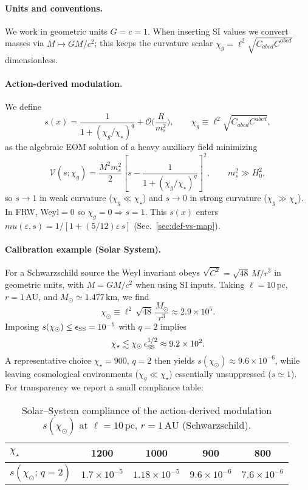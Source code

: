 \documentclass[aps,prd,onecolumn,superscriptaddress,nofootinbib]{revtex4-2}
\def\mu{mu}%
\providecommand{\be}{\begin{equation}}
\providecommand{\ee}{\end{equation}}
\begin{document}
\paragraph{Units and conventions.}
We work in geometric units \(G=c=1\). When inserting SI values we convert masses via \(M\mapsto GM/c^2\); this keeps the curvature scalar \(\chi_g=\ell^2\sqrt{C_{abcd}C^{abcd}}\) dimensionless.

\paragraph{Action-derived modulation.}
We define
\be
s(x)=\frac{1}{1+(\chi_g/\chi_\star)^q}+\mathcal O\!\Big(\frac{R}{m_s^2}\Big),\qquad \chi_g\equiv \ell^2\sqrt{C_{abcd}C^{abcd}},
\ee
as the algebraic EOM solution of a heavy auxiliary field minimizing
\be
\mathcal V(s;\chi_g)=\frac{M^2 m_s^2}{2}\left[s-\frac{1}{1+(\chi_g/\chi_\star)^q}\right]^2,\qquad m_s^2\gg H_0^2,
\ee
so $s\!\to\!1$ in weak curvature (\(\chi_g\!\ll\!\chi_\star\)) and $s\!\to\!0$ in strong curvature (\(\chi_g\!\gg\!\chi_\star\)). In FRW, Weyl$=0$ so \(\chi_g=0\Rightarrow s=1\).
This $s(x)$ enters \(\mu(\varepsilon,s)=1/[1+(5/12)\varepsilon\,s]\) (Sec.~\ref{sec:def-vs-map}).

\paragraph{Calibration example (Solar System).}
For a Schwarzschild source the Weyl invariant obeys \(\sqrt{C^2}=\sqrt{48}\,M/r^3\) in geometric units, with \(M=GM/c^2\) when using SI inputs. Taking \(\ell=10\,\mathrm{pc}\), \(r=1\,\mathrm{AU}\), and \(M_\odot\simeq 1.477\,\mathrm{km}\), we find
\[
\chi_\odot \equiv \ell^2 \, \sqrt{48}\,\frac{M_\odot}{r^3} \approx 2.9\times 10^{5}.
\]
Imposing \(s(\chi_\odot)\le \epsilon_{\rm SS}=10^{-5}\) with \(q=2\) implies
\[
\chi_\star \lesssim \chi_\odot\,\epsilon_{\rm SS}^{1/2} \approx 9.2\times 10^{2}.
\]
A representative choice \(\chi_\star=900\), \(q=2\) then yields \(s(\chi_\odot)\approx 9.6\times 10^{-6}\), while leaving cosmological environments (\(\chi_g\ll\chi_\star\)) essentially unsuppressed (\(s\simeq 1\)). For transparency we report a small compliance table:

\begin{table}[t]
\centering
\caption{Solar–System compliance of the action-derived modulation \(s(\chi_\odot)\) at \(\ell=10\,\mathrm{pc}\), \(r=1\,\mathrm{AU}\) (Schwarzschild).}\label{tab:compliance}
\begin{tabular}{lcccc}
\toprule
$\chi_\star$ & 1200 & 1000 & 900 & 800\\
\midrule
$s(\chi_\odot;\,q{=}2)$ & $1.7\times 10^{-5}$ & $1.18\times 10^{-5}$ & $9.6\times 10^{-6}$ & $7.6\times 10^{-6}$\\
\bottomrule
\end{tabular}
\end{table}
\end{document}

